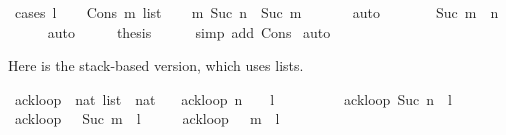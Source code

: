 \begin{isabellebody}
\ {\isacharparenleft}{\kern0pt}cases\ l{\isacharparenright}{\kern0pt}\isanewline
\ \ \isamarkupfalse%
\ {\isacharparenleft}{\kern0pt}Cons\ m\ list{\isacharparenright}{\kern0pt}\isanewline
\ \ \isamarkupfalse%
\ {\isachardoublequoteopen}{\isacharbraceleft}{\kern0pt}{\isacharhash}{\kern0pt}{\isacharparenleft}{\kern0pt}m{\isacharcomma}{\kern0pt}\ Suc\ n{\isacharparenright}{\kern0pt}{\isacharhash}{\kern0pt}{\isacharbraceright}{\kern0pt}\ {\isacharless}{\kern0pt}\ {\isacharbraceleft}{\kern0pt}{\isacharhash}{\kern0pt}{\isacharparenleft}{\kern0pt}Suc\ m{\isacharcomma}{\kern0pt}\ {}{\isacharparenright}{\kern0pt}{\isacharhash}{\kern0pt}{\isacharbraceright}{\kern0pt}{\isachardoublequoteclose}\isanewline
\ \ \ \ \isamarkupfalse%
\ auto\isanewline
\ \ \isamarkupfalse%
\ \isamarkupfalse%
\ {\isachardoublequoteopen}{\isasymdots}\ {\isasymle}\ {\isacharbraceleft}{\kern0pt}{\isacharhash}{\kern0pt}{\isacharparenleft}{\kern0pt}Suc\ m{\isacharcomma}{\kern0pt}\ {}{\isacharparenright}{\kern0pt}{\isacharcomma}{\kern0pt}\ {\isacharparenleft}{\kern0pt}{}{\isacharcomma}{\kern0pt}n{\isacharparenright}{\kern0pt}{\isacharhash}{\kern0pt}{\isacharbraceright}{\kern0pt}{\isachardoublequoteclose}\isanewline
\ \ \ \ \isamarkupfalse%
\ auto\isanewline
\ \ \isamarkupfalse%
\ \isamarkupfalse%
\ {\isacharquery}{\kern0pt}thesis\isanewline
\ \ \ \ \isamarkupfalse%
\ {\isacharparenleft}{\kern0pt}simp\ add{\isacharcolon}{\kern0pt}\ Cons{\isacharparenright}{\kern0pt}\isanewline
{}\isamarkupfalse%
\ auto%
\endisatagproof
{\isafoldproof}%
%
\isadelimproof
%
\endisadelimproof
%
\begin{isamarkuptext}%
Here is the stack-based version, which uses lists.%
\end{isamarkuptext}\isamarkuptrue%
\isamarkupfalse%
\ ackloop\ {\isacharcolon}{\kern0pt}{\isacharcolon}{\kern0pt}\ {\isachardoublequoteopen}nat\ list\ {\isasymRightarrow}\ nat{\isachardoublequoteclose}\ \isanewline
\ \ {\isachardoublequoteopen}ackloop\ {\isacharparenleft}{\kern0pt}n\ {\isacharhash}{\kern0pt}\ {}\ {\isacharhash}{\kern0pt}\ l{\isacharparenright}{\kern0pt}\ \ \ \ \ \ \ \ \ {\isacharequal}{\kern0pt}\ ackloop\ {\isacharparenleft}{\kern0pt}Suc\ n\ {\isacharhash}{\kern0pt}\ l{\isacharparenright}{\kern0pt}{\isachardoublequoteclose}\isanewline
{\isacharbar}{\kern0pt}\ {\isachardoublequoteopen}ackloop\ {\isacharparenleft}{\kern0pt}{}\ {\isacharhash}{\kern0pt}\ Suc\ m\ {\isacharhash}{\kern0pt}\ l{\isacharparenright}{\kern0pt}\ \ \ \ \ {\isacharequal}{\kern0pt}\ ackloop\ {\isacharparenleft}{\kern0pt}{}\ {\isacharhash}{\kern0pt}\ m\ {\isacharhash}{\kern0pt}\ l{\isacharparenright}{\kern0pt}{\isachardoublequoteclose}\isanewline

\end{isabellebody}
